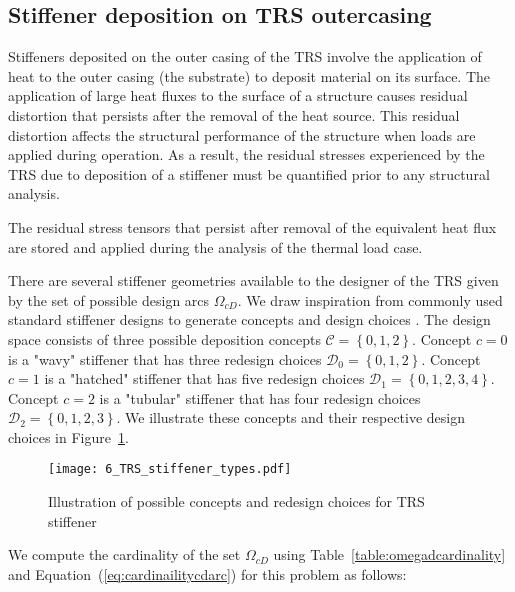 \subsection{Stiffener deposition on \ac{TRS} outercasing} \label{subsec:stiffeners}

Stiffeners deposited on the outer casing of the \ac{TRS} involve the application of heat to the outer casing (the substrate) to deposit material on its surface. The application of large heat fluxes to the surface of a structure causes residual distortion that persists after the removal of the heat source. This residual distortion affects the structural performance of the structure when loads are applied during operation. As a result, the residual stresses experienced by the \ac{TRS} due to deposition of a stiffener must be quantified prior to any structural analysis.

The residual stress tensors that persist after removal of the equivalent heat flux are stored and applied during the analysis of the thermal load case.

There are several stiffener geometries available to the designer of the \ac{TRS} given by the set of possible design arcs $\Omega_{cD}$. We draw inspiration from commonly used standard stiffener designs to generate concepts and design choices \cite{USArmyMaterielCommand1970}. The design space consists of three possible deposition concepts $\mathcal{C} = \left\{0,1,2\right\}$. Concept $c=0$ is a "wavy" stiffener that has three redesign choices $\mathcal{D}_0 = \left\{0,1,2\right\}$. Concept $c=1$ is a "hatched" stiffener that has five redesign choices $\mathcal{D}_1 = \left\{0,1,2,3,4\right\}$. Concept $c=2$ is a "tubular" stiffener that has four redesign choices $\mathcal{D}_2 = \left\{0,1,2,3\right\}$. We illustrate these concepts and their respective design choices in Figure~\ref{fig:designspacestiff}.

\begin{figure}[h!]
	\centering
	\texttt{[image: 6\_TRS\_stiffener\_types.pdf]}
	\caption{Illustration of possible concepts and redesign choices for \ac{TRS} stiffener}
	\label{fig:designspacestiff}
\end{figure}

We compute the cardinality of the set $\Omega_{cD}$ using Table~\ref{table:omegadcardinality} and Equation~(\ref{eq:cardinailitycdarc}) for this problem as follows:

